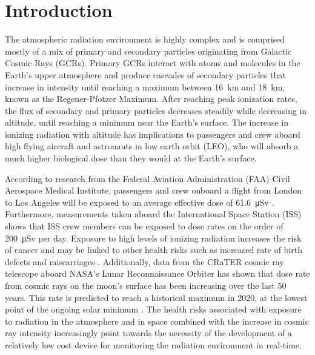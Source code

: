 \section{Introduction}
\label{Introduction}

The atmospheric radiation environment is highly complex and is comprised mostly of a mix of primary and secondary particles originating from Galactic Cosmic Rays (GCRs). Primary GCRs interact with atoms and molecules in the Earth's upper atmosphere and produce cascades of secondary particles that increase in intensity until reaching a maximum between \SI{16}{\km} and \SI{18}{\km}, known as the Regener-Pfotzer Maximum\cite{regener}. After reaching peak ionization rates, the flux of secondary and primary particles decreases steadily while decreasing in altitude, until reaching a minimum near the Earth's surface. The increase in ionizing radiation with altitude has implications to passengers and crew aboard high flying aircraft and astronauts in low earth orbit (LEO), who will absorb a much higher biological dose than they would at the Earth's surface. 

According to research from the Federal Aviation Administration (FAA) Civil Aerospace Medical Institute, passengers and crew onboard a flight from London to Los Angeles will be exposed to an average effective dose of \SI{61.6}{\micro\sievert} \cite{faa}. Furthermore, measurements taken aboard the International Space Station (ISS) shows that ISS crew members can be exposed to dose rates on the order of \SI{200}{\micro\sievert} per day. Exposure to high levels of ionizing radiation increases the risk of cancer and may be linked to other health risks such as increased rate of birth defects and miscarriages \cite{flightatt}. 
Additionally, data from the CRaTER cosmic ray telescope aboard NASA’s Lunar Reconnaissance Orbiter has shown that dose rate from cosmic rays on the moon's surface has been increasing over the last 50 years. This rate is predicted to reach a historical maximum in 2020, at the lowest point of the ongoing solar minimum \cite{crater}. The health risks associated with exposure to radiation in the atmosphere and in space combined with the increase in cosmic ray intensity increasingly point towards the necessity of the development of a relatively low cost device for monitoring the radiation environment in real-time.


